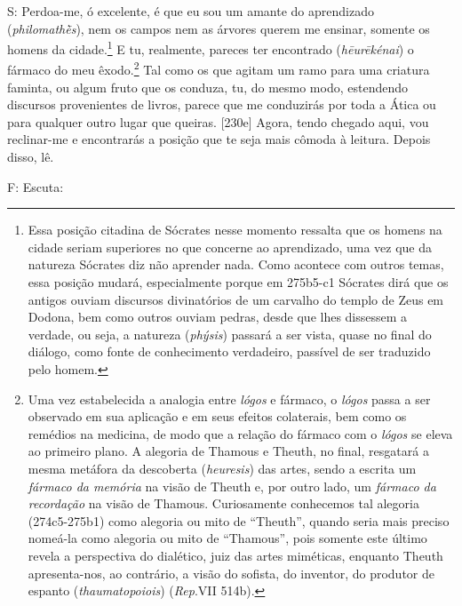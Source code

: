 S: Perdoa-me, ó excelente, é que eu sou um amante do aprendizado
(\emph{philomathḕs}), nem os campos nem as árvores querem me ensinar,
somente os homens da cidade.\footnote{Essa posição citadina de Sócrates
  nesse momento ressalta que os homens na cidade seriam superiores no
  que concerne ao aprendizado, uma vez que da natureza Sócrates diz não
  aprender nada. Como acontece com outros temas, essa posição mudará,
  especialmente porque em 275b5-c1 Sócrates dirá que os antigos ouviam
  discursos divinatórios de um carvalho do templo de Zeus em Dodona, bem
  como outros ouviam pedras, desde que lhes dissessem a verdade, ou
  seja, a natureza (\emph{phýsis}) passará a ser vista, quase no final
  do diálogo, como fonte de conhecimento verdadeiro, passível de ser
  traduzido pelo homem.} E tu, realmente, pareces ter encontrado
(\emph{hēurēkénai}) o fármaco do meu êxodo.\footnote{Uma vez
  estabelecida a analogia entre \emph{lógos} e fármaco, o \emph{lógos}
  passa a ser observado em sua aplicação e em seus efeitos colaterais,
  bem como os remédios na medicina, de modo que a relação do fármaco com
  o \emph{lógos} se eleva ao primeiro plano. A alegoria de Thamous e
  Theuth, no final, resgatará a mesma metáfora da descoberta
  (\emph{heuresis}) das artes, sendo a escrita um \emph{fármaco da
  memória} na visão de Theuth e, por outro lado, um \emph{fármaco da
  recordação} na visão de Thamous. Curiosamente conhecemos tal alegoria
  (274c5-275b1) como alegoria ou mito de ``Theuth'', quando seria mais
  preciso nomeá-la como alegoria ou mito de ``Thamous'', pois somente
  este último revela a perspectiva do dialético, juiz das artes
  miméticas, enquanto Theuth apresenta-nos, ao contrário, a visão do
  sofista, do inventor, do produtor de espanto (\emph{thaumatopoiois})
  (\emph{Rep}.VII 514b).} Tal como os que agitam um ramo para uma
criatura faminta, ou algum fruto que os conduza, tu, do mesmo modo,
estendendo discursos provenientes de livros, parece que me conduzirás
por toda a Ática ou para qualquer outro lugar que queiras. {[}230e{]}
Agora, tendo chegado aqui, vou reclinar-me e encontrarás a posição que
te seja mais cômoda à leitura. Depois disso, lê.

F: Escuta:

